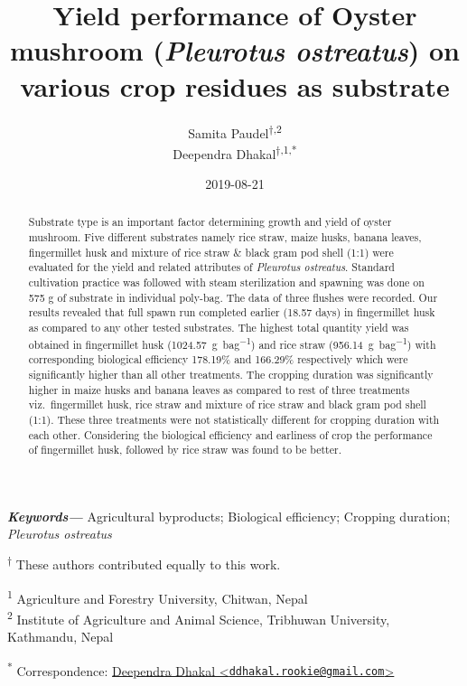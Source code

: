 \documentclass[]{article}
\title{Yield performance of Oyster mushroom (\textit{Pleurotus ostreatus}) on various crop residues as substrate}
\author{Samita Paudel\textsuperscript{$\dagger{}$,2} \\ Deependra Dhakal\textsuperscript{$\dagger{}$,1,*}}
\date{2019-08-21}
\begin{document}
\maketitle
\begin{abstract}
Substrate type is an important factor determining growth and yield of oyster mushroom. Five different substrates namely rice straw, maize husks, banana leaves, fingermillet husk and mixture of rice straw \& black gram pod shell (1:1) were evaluated for the yield and related attributes of \textit{Pleurotus ostreatus}. Standard cultivation practice was followed with steam sterilization and spawning was done on 575 g of substrate in individual poly-bag. The data of three flushes were recorded. Our results revealed that full spawn run completed earlier (18.57 days) in fingermillet husk as compared to any other tested substrates. The highest total quantity yield was obtained in fingermillet husk (\SI{1024.57}{\gram \per bag}) and rice straw (\SI{956.14}{\gram \per bag}) with corresponding biological efficiency 178.19\% and 166.29\% respectively which were significantly higher than all other treatments. The cropping duration was significantly higher in maize husks and banana leaves as compared to rest of three treatments viz.~fingermillet husk, rice straw and mixture of rice straw and black gram pod shell (1:1). These three treatments were not statistically different for cropping duration with each other. Considering the biological efficiency and earliness of crop the performance of fingermillet husk, followed by rice straw was found to be better.
\end{abstract}
\providecommand{\keywords}[1]{\textbf{\textit{Keywords---}} #1}
    \keywords{Agricultural byproducts; Biological efficiency; Cropping duration; \textit{Pleurotus ostreatus}}

{
\setcounter{tocdepth}{3}
\tableofcontents
}
\textsuperscript{$\dagger{}$} These authors contributed equally to this work.

\textsuperscript{1} Agriculture and Forestry University, Chitwan, Nepal\\
\textsuperscript{2} Institute of Agriculture and Animal Science, Tribhuwan University, Kathmandu, Nepal

\textsuperscript{*} Correspondence: \href{mailto:ddhakal.rookie@gmail.com}{Deependra Dhakal \textless{}\href{mailto:ddhakal.rookie@gmail.com}{\nolinkurl{ddhakal.rookie@gmail.com}}\textgreater{}}

\linenumbers

\clearpage
\end{document}
